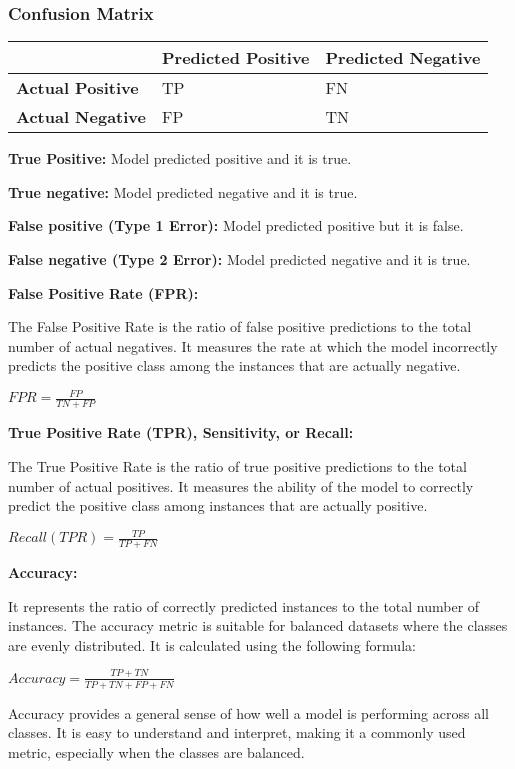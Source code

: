 \documentclass[
]{book}
\begin{document}
\hypertarget{confusion-matrix}{%
\subsubsection{Confusion Matrix}\label{confusion-matrix}}

\begin{longtable}[]{@{}lll@{}}
\toprule\noalign{}
& Predicted Positive & Predicted Negative \\
\midrule\noalign{}
\endhead
\bottomrule\noalign{}
\endlastfoot
\textbf{Actual Positive} & TP & FN \\
\textbf{Actual Negative} & FP & TN \\
\end{longtable}

\textbf{True Positive:} Model predicted positive and it is true.

\textbf{True negative:} Model predicted negative and it is true.

\textbf{False positive (Type 1 Error):} Model predicted positive but it is false.

\textbf{False negative (Type 2 Error):} Model predicted negative and it is true.

\textbf{False Positive Rate (FPR):}

The False Positive Rate is the ratio of false positive predictions to the total number of actual negatives. It measures the rate at which the model incorrectly predicts the positive class among the instances that are actually negative.

\(FPR = \frac{FP}{TN + FP}\)

\textbf{True Positive Rate (TPR), Sensitivity, or Recall:}

The True Positive Rate is the ratio of true positive predictions to the total number of actual positives. It measures the ability of the model to correctly predict the positive class among instances that are actually positive.

\(Recall (TPR) = \frac{TP}{TP + FN}\)

\textbf{Accuracy:}

It represents the ratio of correctly predicted instances to the total number of instances. The accuracy metric is suitable for balanced datasets where the classes are evenly distributed. It is calculated using the following formula:

\(Accuracy = \frac{TP + TN}{TP + TN + FP + FN}\)

Accuracy provides a general sense of how well a model is performing across all classes. It is easy to understand and interpret, making it a commonly used metric, especially when the classes are balanced.
\end{document}
